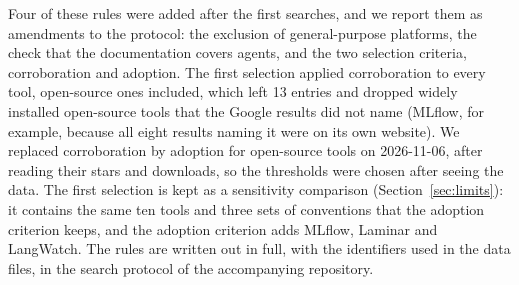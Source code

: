 \documentclass[conference]{IEEEtran}
\begin{document}
Four of these rules were added after the first searches, and we report them as amendments to the protocol: the exclusion of general-purpose platforms, the check that the documentation covers agents, and the two selection criteria, corroboration and adoption. The first selection applied corroboration to every tool, open-source ones included, which left 13 entries and dropped widely installed open-source tools that the Google results did not name (MLflow, for example, because all eight results naming it were on its own website). We replaced corroboration by adoption for open-source tools on 2026-11-06, after reading their stars and downloads, so the thresholds were chosen after seeing the data. The first selection is kept as a sensitivity comparison (Section~\ref{sec:limits}): it contains the same ten tools and three sets of conventions that the adoption criterion keeps, and the adoption criterion adds MLflow, Laminar and LangWatch. The rules are written out in full, with the identifiers used in the data files, in the search protocol of the accompanying repository.

\begin{table}[!t]
\caption{The 13 selected tools and the three sets of telemetry conventions beneath them. Open-source tools are listed by downloads (the larger of PyPI and npm in the last 30 days), then by stars, both read on 2026-11-06; closed-source tools by independent Google sources (``Indep.\ sources''); the number is the order within each group, not a ranking across groups. Stars and downloads are blank for closed-source tools, which are selected on sources, and for OpenTelemetry, and Helicone has no package. ``OTel link'' is how the tool's documentation relates it to OpenTelemetry: it defines the conventions, is built on OpenTelemetry, accepts OpenTelemetry traces, offers optional OpenTelemetry tracing, or models its data like spans; ``not found'' means nothing was found in the pages read (evidence in \texttt{tool\_relations.csv}).}
\label{tab:tools}
\centering
\footnotesize
\setlength{\tabcolsep}{4pt}

\end{table}
\end{document}
